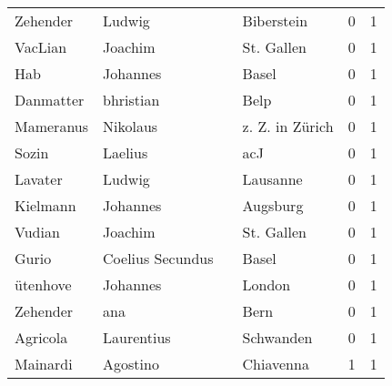 \documentclass[10pt,a4paper,landscape]{article}
\begin{document}
\begin{longtable}{llllrr}
                 Zehender &                             Ludwig &             &                                  Biberstein &          0 &         1 \\
                  VacLian &                            Joachim &             &                                  St. Gallen &          0 &         1 \\
                      Hab &                           Johannes &             &                                       Basel &          0 &         1 \\
                Danmatter &                          bhristian &             &                                        Belp &          0 &         1 \\
                Mameranus &                           Nikolaus &             &                             z. Z. in Zürich &          0 &         1 \\
                    Sozin &                            Laelius &             &                                         acJ &          0 &         1 \\
                  Lavater &                             Ludwig &             &                                    Lausanne &          0 &         1 \\
                 Kielmann &                           Johannes &             &                                    Augsburg &          0 &         1 \\
                   Vudian &                            Joachim &             &                                  St. Gallen &          0 &         1 \\
                    Gurio &                   Coelius Secundus &             &                                       Basel &          0 &         1 \\
                 ütenhove &                           Johannes &             &                                      London &          0 &         1 \\
                 Zehender &                                ana &             &                                        Bern &          0 &         1 \\
                 Agricola &                         Laurentius &             &                                   Schwanden &          0 &         1 \\
                 Mainardi &                           Agostino &             &                                   Chiavenna &          1 &         1 \\

\end{longtable}
\end{document}

